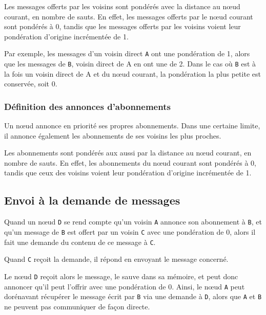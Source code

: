 Les messages offerts par les voisins sont pondérés avec la distance au n\oe ud courant, en nombre de sauts. En effet, les messages offerts par le n\oe ud courant sont pondérés à 0, tandis que les messages offerts par les voisins voient leur pondération d'origine incrémentée de 1.

Par exemple, les messages d'un voisin direct \texttt{A} ont une pondération de 1, alors que les messages de \texttt{B}, voisin direct de \textsf{A} en ont une de 2. Dans le cas où \texttt{B} est à la fois un voisin direct de \textsf{A} et du n\oe ud courant, la pondération la plus petite est conservée, soit 0.




\subsubsection{Définition des annonces d'abonnements}

Un n\oe ud annonce en priorité ses propres abonnements. Dans une certaine limite, il annonce également les abonnements de ses voisins les plus proches.

Les abonnements sont pondérés aux aussi par la distance au n\oe ud courant, en nombre de sauts. En effet, les abonnements du n\oe ud courant sont pondérés à 0, tandis que ceux des voisins voient leur pondération d'origine incrémentée de 1.




\subsection{Envoi à la demande de messages}

Quand un n\oe ud \texttt{D} se rend compte qu'un voisin \texttt{A} annonce son abonnement à \texttt{B}, et qu'un message de \texttt{B} est offert par un voisin \texttt{C} avec une pondération de 0, alors il fait une demande du contenu de ce message à \texttt{C}.


Quand \texttt{C} reçoit la demande, il répond en envoyant le message concerné.


Le n\oe ud \texttt{D} reçoit alors le message, le sauve dans sa mémoire, et peut donc annoncer qu'il peut l'offrir avec une pondération de 0. Ainsi, le n\oe ud \texttt{A} peut dorénavant récupérer le message écrit par \texttt{B} via une demande à \texttt{D}, alors que \texttt{A} et \texttt{B} ne peuvent pas communiquer de façon directe.

